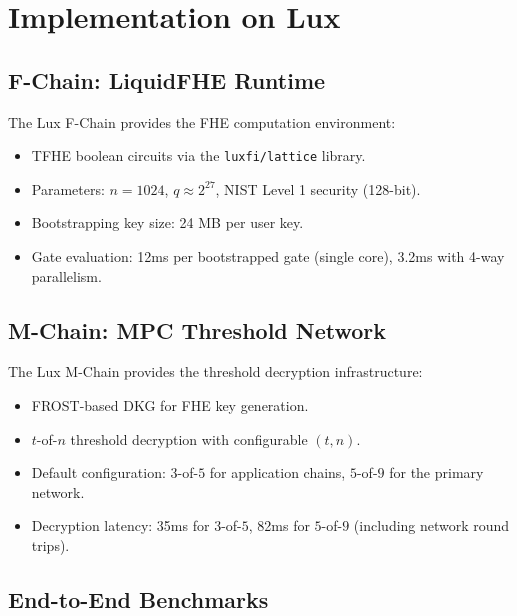 \section{Implementation on Lux}


\subsection{F-Chain: LiquidFHE Runtime}

The Lux F-Chain provides the FHE computation environment:
\begin{itemize}[leftmargin=2em]
\item TFHE boolean circuits via the \texttt{luxfi/lattice} library.
\item Parameters: $n = 1024$, $q \approx 2^{27}$, NIST Level 1 security (128-bit).
\item Bootstrapping key size: 24 MB per user key.
\item Gate evaluation: 12ms per bootstrapped gate (single core), 3.2ms with 4-way parallelism.
\end{itemize}

\subsection{M-Chain: MPC Threshold Network}

The Lux M-Chain provides the threshold decryption infrastructure:
\begin{itemize}[leftmargin=2em]
\item FROST-based DKG for FHE key generation.
\item $t$-of-$n$ threshold decryption with configurable $(t, n)$.
\item Default configuration: $3$-of-$5$ for application chains, $5$-of-$9$ for the primary network.
\item Decryption latency: 35ms for $3$-of-$5$, 82ms for $5$-of-$9$ (including network round trips).
\end{itemize}

\subsection{End-to-End Benchmarks}

